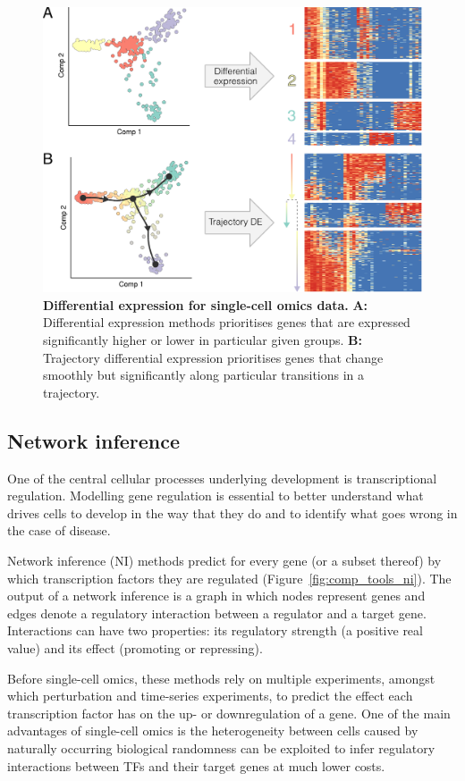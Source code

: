 \begin{figure}[htb!]
	\centering
	\includegraphics[width=.6\linewidth]{fig/comptools2/comptool_4_differentialexpression.pdf} 
	\caption{
		\textbf{Differential expression for single-cell omics data.}
		\textbf{A:} Differential expression methods prioritises genes that are expressed significantly higher or lower in particular given groups.
		\textbf{B:} Trajectory differential expression prioritises genes that change smoothly but significantly along particular transitions in a trajectory.
	}
	\label{fig:comp_tools_de}
\end{figure}

\subsection{Network inference}
One of the central cellular processes underlying development is transcriptional regulation. 	
Modelling gene regulation is essential to better understand what drives cells to develop in the way that they do and to identify what goes wrong in the case of disease.

Network inference (NI) methods predict for every gene (or a subset thereof) by which transcription factors they are regulated (Figure~\ref{fig:comp_tools_ni}). The output of a network inference is a graph in which nodes represent genes and edges denote a regulatory interaction between a regulator and a target gene. Interactions can have two properties: its regulatory strength (a positive real value) and its effect (promoting or repressing).

Before single-cell omics, these methods rely on multiple experiments, amongst which perturbation and time-series experiments, to predict the effect each transcription factor has on the up- or downregulation of a gene. One of the main advantages of single-cell omics is the heterogeneity between cells caused by naturally occurring biological randomness \cite{padovan-merhar_usingvariabilitygene_2013} can be exploited to infer regulatory interactions between TFs and their target genes at much lower costs. 

